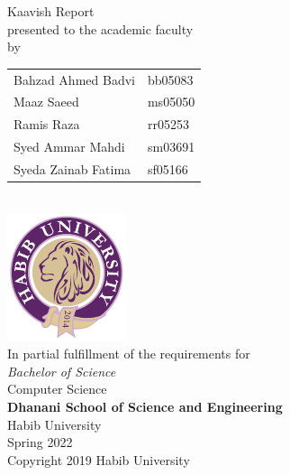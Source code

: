 \begin{titlepage}
  
  \begin{center}
    \vfill
    \textbf{\Huge \Title}
    \bigskip

    {\large Kaavish Report\\
      presented to the academic faculty\\
      by\\\bigskip
      \begin{tabular}{ll}
        Bahzad Ahmed Badvi & bb05083\\
        Maaz Saeed & ms05050\\
        Ramis Raza & rr05253\\
        Syed Ammar Mahdi & sm03691\\
        Syeda Zainab Fatima & sf05166\\
      \end{tabular}
    }\\\vfill
    \includegraphics[width=.4\textwidth]{logo.pdf}\\
    {\large In partial fulfillment of the requirements for\\
      \textit{Bachelor of Science}\\
      Computer Science\\\medskip
      \textbf{Dhanani School of Science and Engineering}\\\medskip
      Habib University\\\smallskip
      Spring 2022
    }\\\vfill
    Copyright {\scriptsize \textcopyright} 2019 Habib University
  \end{center}
  \restoregeometry
\end{titlepage}

